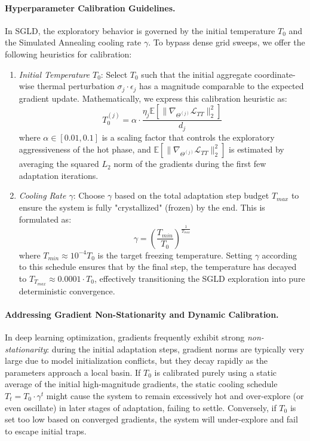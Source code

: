 \paragraph{Hyperparameter Calibration Guidelines.} In SGLD, the exploratory behavior is governed by the initial temperature $T_0$ and the Simulated Annealing cooling rate $\gamma$.
To bypass dense grid sweeps, we offer the following heuristics for calibration:
\begin{enumerate}
\item \emph{Initial Temperature $T_0$}: Select $T_0$ such that the initial aggregate coordinate-wise thermal perturbation $\sigma_j \cdot \epsilon_j$ has a magnitude comparable to the expected gradient update.
Mathematically, we express this calibration heuristic as:
    \begin{equation}
        T_0^{(j)} = \alpha \cdot \frac{\eta_j \mathbb{E}\left[\|\nabla_{\Theta^{(j)}} \mathcal{L}_{TT}\|_2^2\right]}{d_j}
    \end{equation}
where $\alpha \in [0.01, 0.1]$ is a scaling factor that controls the exploratory aggressiveness of the hot phase, and $\mathbb{E}\left[\|\nabla_{\Theta^{(j)}} \mathcal{L}_{TT}\|_2^2\right]$ is estimated by averaging the squared $L_2$ norm of the gradients during the first few adaptation iterations.
\item \emph{Cooling Rate $\gamma$}: Choose $\gamma$ based on the total adaptation step budget $T_{max}$ to ensure the system is fully "crystallized" (frozen) by the end.
This is formulated as:
    \begin{equation}
        \gamma = \left(\frac{T_{min}}{T_0}\right)^{\frac{1}{T_{max}}}
    \end{equation}
where $T_{min} \approx 10^{-4} T_0$ is the target freezing temperature.
Setting $\gamma$ according to this schedule ensures that by the final step, the temperature has decayed to $T_{T_{max}} \approx 0.0001 \cdot T_0$, effectively transitioning the SGLD exploration into pure deterministic convergence.
\end{enumerate}

\paragraph{Addressing Gradient Non-Stationarity and Dynamic Calibration.} In deep learning optimization, gradients frequently exhibit strong \emph{non-stationarity}: during the initial adaptation steps, gradient norms are typically very large due to model initialization conflicts, but they decay rapidly as the parameters approach a local basin.
If $T_0$ is calibrated purely using a static average of the initial high-magnitude gradients, the static cooling schedule $T_t = T_0 \cdot \gamma^t$ might cause the system to remain excessively hot and over-explore (or even oscillate) in later stages of adaptation, failing to settle.
Conversely, if $T_0$ is set too low based on converged gradients, the system will under-explore and fail to escape initial traps.

